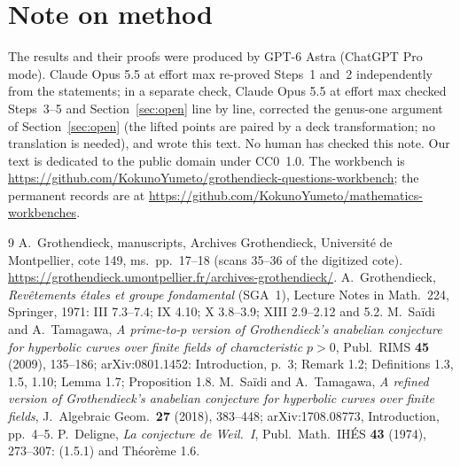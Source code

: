 \documentclass[11pt]{amsart}
\newcommand{\workbenchurl}{https://github.com/KokunoYumeto/grothendieck-questions-workbench}
\newcommand{\recordurl}{https://github.com/KokunoYumeto/mathematics-workbenches}
\theoremstyle{remark}
\begin{document}
\section*{Note on method}
The results and their proofs were produced by GPT-6 Astra (ChatGPT Pro mode). Claude Opus 5.5 at effort max re-proved Steps~1 and~2 independently from the statements; in a separate check, Claude Opus 5.5 at effort max checked Steps~3--5 and Section~\ref{sec:open} line by line, corrected the genus-one argument of Section~\ref{sec:open} (the lifted points are paired by a deck transformation; no translation is needed), and wrote this text. No human has checked this note. Our text is dedicated to the public domain under CC0~1.0. The workbench is \expandafter\url\expandafter{\workbenchurl}; the permanent records are at \expandafter\url\expandafter{\recordurl}.

\begin{thebibliography}{9}
 A.~Grothendieck, manuscripts, Archives Grothendieck, Universit\'e de Montpellier, cote 149, ms.~pp.~17--18 (scans 35--36 of the digitized cote). \url{https://grothendieck.umontpellier.fr/archives-grothendieck/}.
 A.~Grothendieck, \emph{Rev\^etements \'etales et groupe fondamental} (SGA~1), Lecture Notes in Math.\ 224, Springer, 1971: III 7.3--7.4; IX 4.10; X 3.8--3.9; XIII 2.9--2.12 and 5.2.
 M.~Sa\"idi and A.~Tamagawa, \emph{A prime-to-$p$ version of Grothendieck's anabelian conjecture for hyperbolic curves over finite fields of characteristic $p>0$}, Publ.\ RIMS \textbf{45} (2009), 135--186; arXiv:0801.1452: Introduction, p.~3; Remark 1.2; Definitions 1.3, 1.5, 1.10; Lemma 1.7; Proposition 1.8.
 M.~Sa\"idi and A.~Tamagawa, \emph{A refined version of Grothendieck's anabelian conjecture for hyperbolic curves over finite fields}, J.\ Algebraic Geom.\ \textbf{27} (2018), 383--448; arXiv:1708.08773, Introduction, pp.~4--5.
 P.~Deligne, \emph{La conjecture de Weil.~I}, Publ.\ Math.\ IH\'ES \textbf{43} (1974), 273--307: (1.5.1) and Th\'eor\`eme 1.6.
\end{thebibliography}
\end{document}
